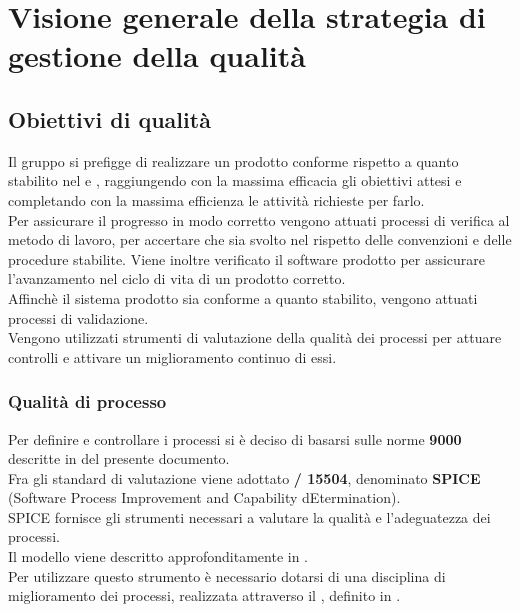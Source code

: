 \section{Visione generale della strategia di gestione della qualità}
\subsection{Obiettivi di qualità}
Il gruppo si prefigge di realizzare un prodotto conforme rispetto a quanto stabilito nel \PianoDiQualifica{} e \AnalisiDeiRequisiti{}, raggiungendo con la massima efficacia gli obiettivi attesi e completando con la massima efficienza le attività richieste per farlo.\\
Per assicurare il progresso in modo corretto vengono attuati processi di verifica al metodo di lavoro, per accertare che sia svolto nel rispetto delle convenzioni e delle procedure stabilite. Viene inoltre verificato il software prodotto per assicurare l'avanzamento nel ciclo di vita di un prodotto corretto.\\
Affinchè il sistema prodotto sia conforme a quanto stabilito, vengono attuati processi di validazione.\\
Vengono utilizzati strumenti di valutazione della qualità dei processi per attuare controlli e attivare un miglioramento continuo di essi.

\subsubsection{Qualità di processo}
Per definire e controllare i processi si è deciso di basarsi sulle norme \textbf{ 9000} descritte in  del presente documento.\\
Fra gli standard di valutazione viene adottato \textbf{/ 15504}, denominato \textbf{SPICE} (Software Process Improvement and Capability dEtermination).\\
SPICE fornisce gli strumenti necessari a valutare la qualità e l'adeguatezza dei processi.\\
Il modello viene descritto approfonditamente in .\\
Per utilizzare questo strumento è necessario dotarsi di una disciplina di miglioramento dei processi, realizzata attraverso il , definito in .

